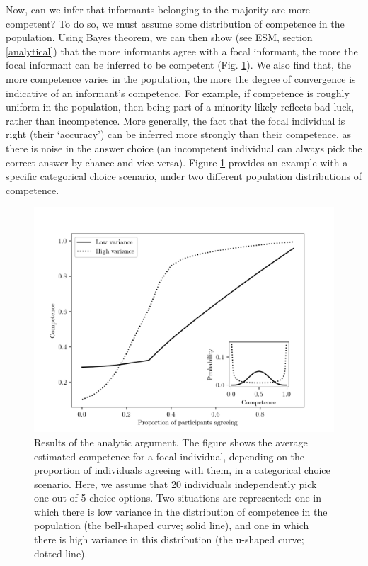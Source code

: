\documentclass[
  doc,floatsintext]{apa6}
\begin{document}
Now, can we infer that informants belonging to the majority are more competent? To do so, we must assume some distribution of competence in the population. Using Bayes theorem, we can then show (see ESM, section \ref{analytical}) that the more informants agree with a focal informant, the more the focal informant can be inferred to be competent (Fig. \ref{fig:figure-Benoit-2}). We also find that, the more competence varies in the population, the more the degree of convergence is indicative of an informant's competence. For example, if competence is roughly uniform in the population, then being part of a minority likely reflects bad luck, rather than incompetence. More generally, the fact that the focal individual is right (their `accuracy') can be inferred more strongly than their competence, as there is noise in the answer choice (an incompetent individual can always pick the correct answer by chance and vice versa). Figure \ref{fig:figure-Benoit-2} provides an example with a specific categorical choice scenario, under two different population distributions of competence.



\begin{figure}

\includegraphics[width=0.75\linewidth]{figures/figure_Benoit-2} \hfill{}

\caption{Results of the analytic argument. The figure shows the average estimated competence for a focal individual, depending on the proportion of individuals agreeing with them, in a categorical choice scenario. Here, we assume that 20 individuals independently pick one out of 5 choice options. Two situations are represented: one in which there is low variance in the distribution of competence in the population (the bell-shaped curve; solid line), and one in which there is high variance in this distribution (the u-shaped curve; dotted line).}\label{fig:figure-Benoit-2}
\end{figure}
\end{document}
